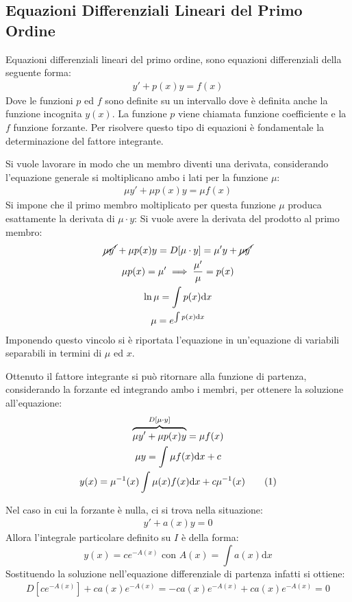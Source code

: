 \documentclass{article}
\newcommand{\df}{\mathrm{d}}
\numberwithin{equation}{subsection}
\newcommand{\tageq}{\tag{\stepcounter{equation}\theequation}}
\begin{document}
\subsection{Equazioni Differenziali Lineari del Primo Ordine}
\label{sec:eq-dff-1}

Equazioni differenziali lineari del primo ordine, sono equazioni differenziali della seguente forma:
\begin{gather}
    y'+p(x)y=f(x)
\end{gather}
Dove le funzioni $p$ ed $f$ sono definite su un intervallo dove è definita anche la funzione incognita $y(x)$. La funzione $p$ viene chiamata funzione coefficiente e la  $f$ funzione forzante. Per risolvere questo tipo di equazioni è fondamentale la determinazione del fattore integrante. 


Si vuole lavorare in modo che un membro diventi una derivata, considerando l'equazione generale si moltiplicano ambo i lati per la funzione $\mu$:
\begin{gather*}
    \mu y'+\mu p(x)y=\mu f(x)
\end{gather*}
Si impone che il primo membro moltiplicato per questa funzione $\mu$ produca esattamente la derivata di $\mu\cdot y$:
Si vuole avere la derivata del prodotto al primo membro:
\begin{gather*}
    \cancel{\mu y'}+\mu p(x)y=D[\mu\cdot y]=\mu'y+\cancel{\mu y'}\\
    \mu p(x)=\mu'\implies\frac{\mu'}{\mu}=p(x)\\
    \ln\mu=\displaystyle\int p(x)\df x\\
    \mu=e^{\int p(x)\df x}
\end{gather*}
Imponendo questo vincolo si è riportata l'equazione in un'equazione di variabili separabili in termini di $\mu$ ed $x$. 

Ottenuto il fattore integrante si può ritornare alla funzione di partenza, considerando la forzante ed integrando ambo i membri, per ottenere la soluzione all'equazione:
\begin{gather*}
    \overbrace{\mu y'+\mu p(x)y}^{D[\mu\cdot y]}=\mu f(x)\\
    \mu y=\int\mu f(x)\df x+c\\
    y(x)=\mu^{-1}(x)\int\mu(x)f(x)\df x+c\mu^{-1}(x)\tageq
\end{gather*}


Nel caso in cui la forzante è nulla, ci si trova nella situazione:
\begin{gather*}
    y'+a(x)y=0
\end{gather*}
Allora l'integrale particolare definito su $I$ è della forma:
\begin{equation}
    y(x)=ce^{-A(x)}\mbox{ con } A(x)=\int a(x)\df x
\end{equation}
Sostituendo la soluzione nell'equazione differenziale di partenza infatti si ottiene:
\begin{gather*}
    D[ce^{-A(x)}]+ca(x)e^{-A(x)}=-ca(x)e^{-A(x)}+ca(x)e^{-A(x)}=0
\end{gather*}
\end{document}
